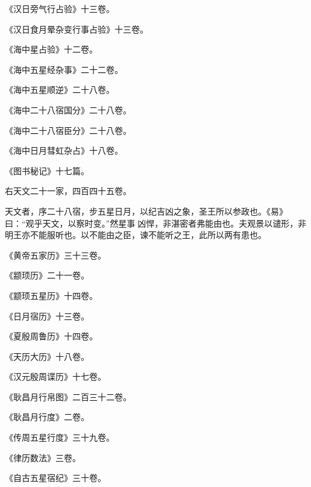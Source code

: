 \documentclass[12pt,UTF8]{ctexbook}
\begin{document}
《汉日旁气行占验》十三卷。



《汉日食月晕杂变行事占验》十三卷。



《海中星占验》十二卷。



《海中五星经杂事》二十二卷。



《海中五星顺逆》二十八卷。



《海中二十八宿国分》二十八卷。



《海中二十八宿臣分》二十八卷。



《海中日月彗虹杂占》十八卷。



《图书秘记》十七篇。



右天文二十一家，四百四十五卷。



天文者，序二十八宿，步五星日月，以纪吉凶之象，圣王所以参政也。《易》曰：“观乎天文，以察时变。”然星事凶悍，非湛密者弗能由也。夫观景以谴形，非明王亦不能服听也。以不能由之臣，谏不能听之王，此所以两有患也。



《黄帝五家历》三十三卷。



《颛顼历》二十一卷。



《颛顼五星历》十四卷。



《日月宿历》十三卷。



《夏殷周鲁历》十四卷。



《天历大历》十八卷。



《汉元殷周谍历》十七卷。



《耿昌月行帛图》二百三十二卷。



《耿昌月行度》二卷。



《传周五星行度》三十九卷。



《律历数法》三卷。



《自古五星宿纪》三十卷。
\end{document}
